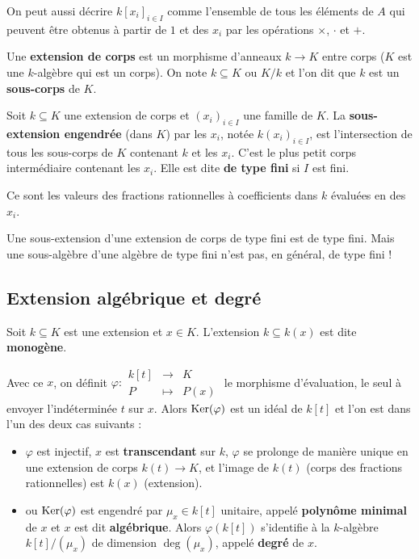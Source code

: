 	On peut aussi décrire $k[x_i]_{i \in I}$ comme l'ensemble de tous les éléments de $A$ qui peuvent être obtenus à partir de $1$ et des $x_i$ par les opérations $\times$, $\cdot$ et $+$.
	
	\begin{defn}
		Une \textbf{extension de corps} est un morphisme d'anneaux $k \to K$ entre corps ($K$ est une $k$-algèbre qui est un corps).
		On note $k \subseteq K$ ou $K/k$ et l'on dit que $k$ est un \textbf{sous-corps} de $K$.
	\end{defn}
	
	\begin{defn}
		Soit $k \subseteq K$ une extension de corps et $(x_i)_{i \in I}$ une famille de $K$.
		La \textbf{sous-extension engendrée} (dans $K$) par les $x_i$, notée $k(x_i)_{i \in I}$, est l'intersection de tous les sous-corps de $K$ contenant $k$ et les $x_i$.
		C'est le plus petit corps intermédiaire contenant les $x_i$.
		Elle est dite \textbf{de type fini} si $I$ est fini.
	\end{defn}
	
	Ce sont les valeurs des fractions rationnelles à coefficients dans $k$ évaluées en des $x_i$.
	
	\begin{pop}
		Une sous-extension d'une extension de corps de type fini est de type fini.
		Mais une sous-algèbre d'une algèbre de type fini n'est pas, en général, de type fini !
	\end{pop}


\subsection{Extension algébrique et degré}

	\begin{defn}
		Soit $k \subseteq K$ est une extension et $x \in K$.
		L'extension $k \subseteq k(x)$ est dite \textbf{monogène}.
	\end{defn}
	
	Avec ce $x$, on définit $\varphi \colon \begin{array}{rcl} k[t] & \to & K \\ P & \mapsto & P(x) \end{array}$ le morphisme d'évaluation, le seul à envoyer l'indéterminée $t$ sur $x$.
	Alors $\operatorname{Ker}(\varphi)$ est un idéal de $k[t]$ et l'on est dans l'un des deux cas suivants :
	\begin{itemize}
		\item[\textbullet] $\varphi$ est injectif, $x$ est \textbf{transcendant} sur $k$, $\varphi$ se prolonge de manière unique en une extension de corps $k(t) \to K$, et l'image de $k(t)$ (corps des fractions rationnelles) est $k(x)$ (extension).
		\item[\textbullet] ou $\operatorname{Ker}(\varphi)$ est engendré par $\mu_x \in k[t]$ unitaire, appelé \textbf{polynôme minimal} de $x$ et $x$ est dit \textbf{algébrique}. Alors $\varphi(k[t])$ s'identifie à la $k$-algèbre $k[t]/(\mu_x)$ de dimension $\deg(\mu_x)$, appelé \textbf{degré} de $x$.
	\end{itemize}
	
